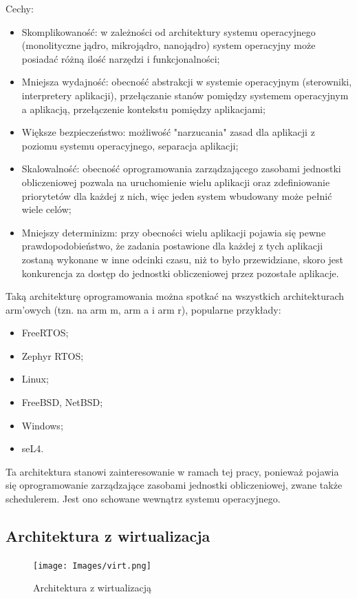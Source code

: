 \documentclass[../../main]{subfiles}
\begin{document}
Cechy:
\begin{itemize}
    \item Skomplikowaność: w zależności od architektury systemu operacyjnego (monolityczne jądro,
    mikrojądro, nanojądro) system operacyjny może posiadać różną ilość narzędzi i funkcjonalności;
    \item Mniejsza wydajność: obecność abstrakcji w systemie operacyjnym (sterowniki,
    interpretery aplikacji), przełączanie stanów pomiędzy systemem operacyjnym a aplikacją,
    przełączenie kontekstu pomiędzy aplikacjami;
    \item Większe bezpieczeństwo: możliwość "narzucania" zasad dla aplikacji z poziomu systemu
    operacyjnego, separacja aplikacji;
    \item Skalowalność: obecność oprogramowania zarządzającego zasobami jednostki obliczeniowej pozwala
    na uruchomienie wielu aplikacji oraz zdefiniowanie priorytetów dla każdej z nich, więc jeden
    system wbudowany może pełnić wiele celów;
    \item Mniejszy determinizm: przy obecności wielu aplikacji pojawia się pewne prawdopodobieństwo,
    że zadania postawione dla każdej z tych aplikacji zostaną wykonane w inne odcinki czasu, niż to
    było przewidziane, skoro jest konkurencja za dostęp do jednostki obliczeniowej przez pozostałe
    aplikacje.
\end{itemize}

Taką architekturę oprogramowania można spotkać na wszystkich architekturach \acrshort{arm}'owych (tzn.
na \acrshort{arm} \acrshort{m}, \acrshort{arm} \acrshort{a} i \acrshort{arm} \acrshort{r}), popularne
przykłady:

\begin{itemize}
    \item FreeRTOS;
    \item Zephyr RTOS;
    \item Linux;
    \item FreeBSD, NetBSD;
    \item Windows;
    \item seL4.
\end{itemize}

Ta architektura stanowi zainteresowanie w ramach tej pracy, ponieważ pojawia się oprogramowanie
zarządzające zasobami jednostki obliczeniowej, zwane także schedulerem. Jest ono schowane wewnątrz
systemu operacyjnego.

\subsection{Architektura z wirtualizacja}
\begin{figure}[h]
    \centering
    \texttt{[image: Images/virt.png]}
    \caption{Architektura z wirtualizacją}
    \label{fig:virt}
\end{figure}
\end{document}
